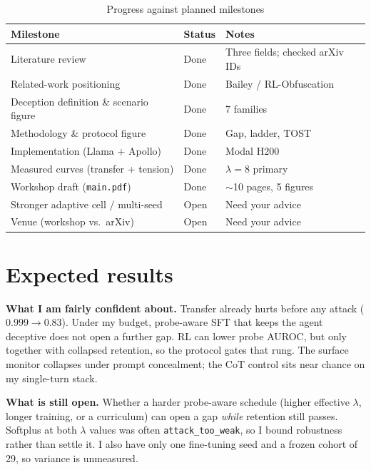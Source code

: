 \documentclass{webofc}
\begin{document}
\begin{table}
\centering
\caption{Progress against planned milestones}
\label{tab-progress}
\begin{tabular}{lll}
\hline
Milestone & Status & Notes \\\hline
Literature review & Done & Three fields; checked arXiv IDs \\
Related-work positioning & Done & Bailey / RL-Obfuscation \\
Deception definition \& scenario figure & Done & 7 families \\
Methodology \& protocol figure & Done & Gap, ladder, TOST \\
Implementation (Llama + Apollo) & Done & Modal H200 \\
Measured curves (transfer + tension) & Done & $\lambda{=}8$ primary \\
Workshop draft (\texttt{main.pdf}) & Done & $\sim$10 pages, 5 figures \\
Stronger adaptive cell / multi-seed & Open & Need your advice \\
Venue (workshop vs.\ arXiv) & Open & Need your advice \\\hline
\end{tabular}
\end{table}

\section{Expected results}
\label{sec-expected}
\textbf{What I am fairly confident about.} Transfer already hurts before any
attack ($0.999\to0.83$). Under my budget, probe-aware SFT that keeps the agent
deceptive does not open a further gap. RL can lower probe AUROC, but only
together with collapsed retention, so the protocol gates that rung. The surface
monitor collapses under prompt concealment; the CoT control sits near chance on
my single-turn stack.

\textbf{What is still open.} Whether a harder probe-aware schedule (higher
effective $\lambda$, longer training, or a curriculum) can open a gap
\emph{while} retention still passes. Softplus at both $\lambda$ values was often
\texttt{attack\_too\_weak}, so I bound robustness rather than settle it. I also
have only one fine-tuning seed and a frozen cohort of 29, so variance is
unmeasured.
\end{document}
